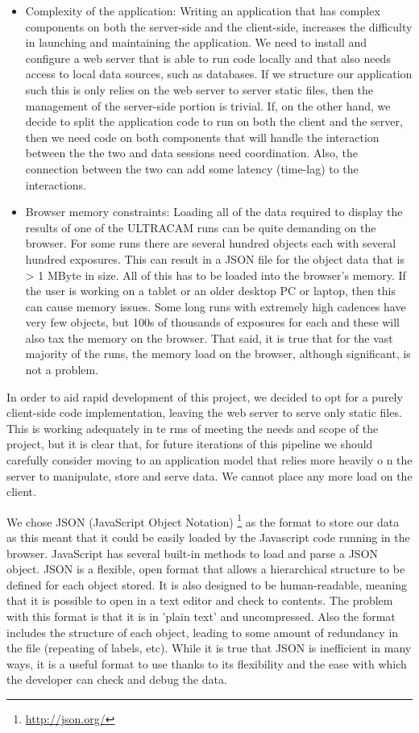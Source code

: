 \begin{itemize}
  \item Complexity of the application: Writing an application that has complex components on both the server-side and the client-side, increases the difficulty in launching and maintaining the application. We need to install and configure a web server that is able to run code locally and that also needs access to local data sources, such as databases. If we structure our application such this is only relies on the web server to server static files, then the management of the server-side portion is trivial. If, on the other hand, we decide to split the application code to run on both the client and the server, then we need code on both components that will handle the interaction between the the two and data sessions need coordination. Also, the connection between the two can add some latency (time-lag) to the interactions. 

  \item Browser memory constraints: Loading all of the data required to display the results of one of the ULTRACAM runs can be quite demanding on the browser. For some runs there are several hundred objects each with several hundred exposures. This can result in a JSON file for the object data that is > 1 MByte in size. All of this has to be loaded into the browser's memory. If the user is working on a tablet or an older desktop PC or laptop, then this can cause memory issues. Some long runs with extremely high cadences have very few objects, but 100s of thousands of exposures for each and these will also tax the memory on the browser. That said, it is true that for the vast majority of the runs, the memory load on the browser, although significant, is not a problem.   
\end{itemize}

In order to aid rapid development of this project, we decided to opt for a purely client-side code implementation, leaving the web server to serve only static files. This is working adequately in te
rms of meeting the needs and scope of the project, but it is clear that, for future iterations of this pipeline we should carefully consider moving to an application model that relies more heavily o
n the server to manipulate, store and serve data. We cannot place any more load on the client. 

We chose JSON (JavaScript Object Notation) \footnote{\url{http://json.org/}} as the format to store our data as this meant that it could be easily loaded by the Javascript code running in the browser. JavaScript has several built-in methods to load and parse a JSON object. JSON is a flexible, open format that allows a hierarchical structure to be defined for each object stored. It is also designed to be human-readable, meaning that it is possible to open in a text editor and check to contents. The problem with this format is that it is in 'plain text' and uncompressed. Also the format includes the structure of each object, leading to some amount of redundancy in the file (repeating of labels, etc). While it is true that JSON is inefficient in many ways, it is a useful format to use thanks to its flexibility and the ease with which the developer can check and debug the data. 

